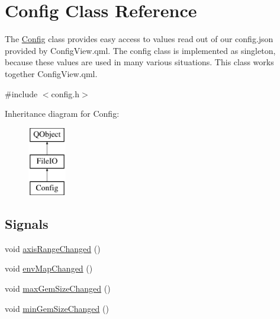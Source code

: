 \hypertarget{class_config}{}\section{Config Class Reference}
\label{class_config}


The \hyperlink{class_config}{Config} class provides easy access to values read out of our config.\+json provided by Config\+View.\+qml.  The config class is implemented as singleton, because these values are used in many various situations. This class works together Config\+View.\+qml.  




{\ttfamily \#include $<$config.\+h$>$}

Inheritance diagram for Config\+:\begin{figure}[H]
\begin{center}
\leavevmode
\includegraphics[height=3.000000cm]{class_config}
\end{center}
\end{figure}
\subsection*{Signals}
\begin{DoxyCompactItemize}
\item 
void \hyperlink{class_config_a5681c5b14ccda37c70498b984bd706ff}{axis\+Range\+Changed} ()
\item 
void \hyperlink{class_config_a46f1b9a172d4f44882d784e6f880480e}{env\+Map\+Changed} ()
\item 
void \hyperlink{class_config_a4ef0417dbecefc3febeee33cdf93488d}{max\+Gem\+Size\+Changed} ()
\item 
void \hyperlink{class_config_a3d78af7f9a04ae58883f7f309d0f43d7}{min\+Gem\+Size\+Changed} ()
\end{DoxyCompactItemize}
